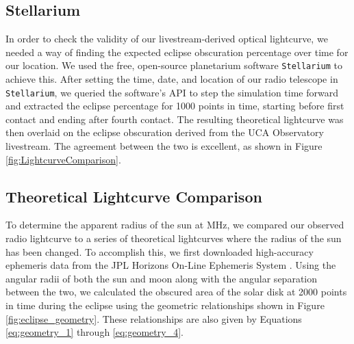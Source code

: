 \subsection{\label{sec:stellarium}Stellarium}

In order to check the validity of our livestream-derived optical lightcurve, we needed a way of finding the expected eclipse obscuration percentage over time for our location.
We used the free, open-source planetarium software \texttt{Stellarium}\cite{zotti_simulated_2020} to achieve this.
After setting the time, date, and location of our radio telescope in \texttt{Stellarium}, we queried the software's API to step the simulation time forward and extracted the eclipse percentage for 1000 points in time, starting before first contact and ending after fourth contact.
The resulting theoretical lightcurve was then overlaid on the eclipse obscuration derived from the UCA Observatory livestream.
The agreement between the two is excellent, as shown in Figure \ref{fig:LightcurveComparison}.

\subsection{\label{sec:theoreticalLightcurves}Theoretical Lightcurve Comparison}

To determine the apparent radius of the sun at \unit[1420]{MHz}, we compared our observed radio lightcurve to a series of theoretical lightcurves where the radius of the sun has been changed.
To accomplish this, we first downloaded high-accuracy ephemeris data from the JPL Horizons On-Line Ephemeris System \cite{nasa_jpl_solar_system_dynamics_group_jpl_nodate}. 
Using the angular radii of both the sun and moon along with the angular separation between the two, we calculated the obscured area of the solar disk at 2000 points in time during the eclipse using the geometric relationships shown in Figure \ref{fig:eclipse_geometry}.
These relationships are also given by Equations \ref{eq:geometry_1} through \ref{eq:geometry_4}.

